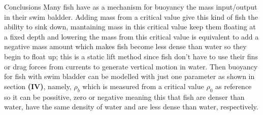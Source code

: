 \begin{section}{Conclusions}
    Many fish have as a mechanism for buoyancy the mass input/output in their swim baldder. 
    Adding mass from a critical value give this kind of fish the ability to sink down,
    mantaining mass in this critical value keep them floating at a fixed depth and lowering 
    the mass from this critical value is equivalent to add a negative mass amount which 
    makes fish become less dense than water so they begin to float up; this is a static lift 
    method since fish don't have to use their fins or drag forces from currents to generate 
    vertical motion in water. Then buoyancy for fish with swim bladder can be modelled with 
    just one parameter as shown in section \textbf{(IV)}, namely, $\rho_b$  which is measured
    from a critical value $\rho_0$ as reference so it can be possitive, zero or negative
    meaning this that fish are denser than water, have the same density of water and are less 
    dense than water, respectively.
\end{section}
